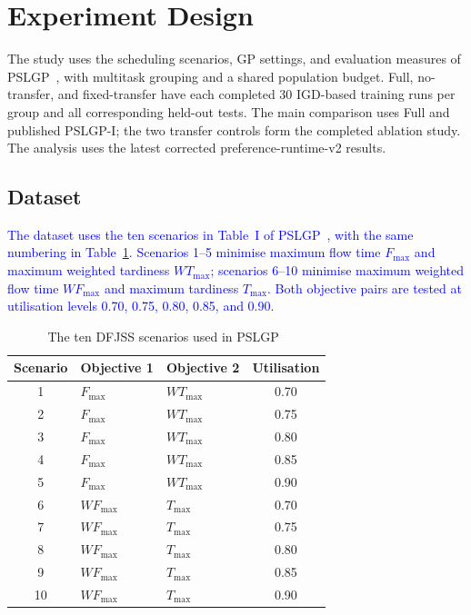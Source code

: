 \documentclass[10pt,journal]{IEEEtran}
\newcommand{\revision}[1]{\textcolor{blue}{#1}}
\newcommand{\resultrevision}[1]{\textcolor{resultrevision}{#1}}
\begin{document}
\section{Experiment Design}
\label{sec:experiment-design}
\resultrevision{The study uses the scheduling scenarios, GP settings, and evaluation measures of PSLGP~\cite{xu2026pslgp}, with multitask grouping and a shared population budget. Full, no-transfer, and fixed-transfer have each completed 30 IGD-based training runs per group and all corresponding held-out tests. The main comparison uses Full and published PSLGP-I; the two transfer controls form the completed ablation study. The analysis uses the latest corrected preference-runtime-v2 results.}

\subsection{Dataset}
\revision{The dataset uses the ten scenarios in Table~I of PSLGP~\cite{xu2026pslgp}, with the same numbering in Table~\ref{tab:pslgp-scenarios}. Scenarios 1--5 minimise maximum flow time $F_{\max}$ and maximum weighted tardiness $WT_{\max}$; scenarios 6--10 minimise maximum weighted flow time $WF_{\max}$ and maximum tardiness $T_{\max}$. Both objective pairs are tested at utilisation levels 0.70, 0.75, 0.80, 0.85, and 0.90.}

\begin{table}[t]
\centering
\caption{The ten DFJSS scenarios used in PSLGP~\cite{xu2026pslgp}}
\label{tab:pslgp-scenarios}
\footnotesize
\begin{tabular}{cllc}
\toprule
Scenario & Objective 1 & Objective 2 & Utilisation \\
\midrule
1 & $F_{\max}$ & $WT_{\max}$ & 0.70 \\
2 & $F_{\max}$ & $WT_{\max}$ & 0.75 \\
3 & $F_{\max}$ & $WT_{\max}$ & 0.80 \\
4 & $F_{\max}$ & $WT_{\max}$ & 0.85 \\
5 & $F_{\max}$ & $WT_{\max}$ & 0.90 \\
\midrule
6 & $WF_{\max}$ & $T_{\max}$ & 0.70 \\
7 & $WF_{\max}$ & $T_{\max}$ & 0.75 \\
8 & $WF_{\max}$ & $T_{\max}$ & 0.80 \\
9 & $WF_{\max}$ & $T_{\max}$ & 0.85 \\
10 & $WF_{\max}$ & $T_{\max}$ & 0.90 \\
\bottomrule
\end{tabular}
\end{table}
\end{document}
